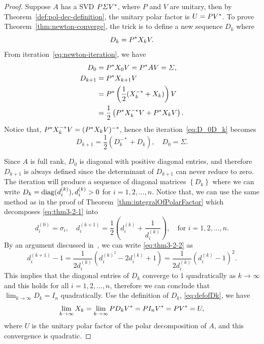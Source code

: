 \documentclass[12pt]{article}
\begin{document}
\begin{proof}
    Suppose $A$ has a SVD $P\varSigma V^*$, where $P$ and $V$ are unitary, then by Theorem~\ref{def:pol-dec-definition}, the unitary polar factor is $U = PV^*$. To prove Theorem~\ref{thm:newton-converge}, the trick is to define a new sequence $D_k$ where 
    \begin{equation}
        \label{eq:defofDk} 
        D_k = P^* X_k V.
    \end{equation} 
    From iteration~\eqref{eq:newton-iteration}, we have 
    \begin{equation}
        \label{eq:D_0D_k}
        \begin{aligned}
            D_0 &= P^* X_0 V = P^* A V = \varSigma,\\
            D_{k + 1} & = P^* X_{k+1} V \\
            & = P^* \left(\frac{1}{2} (X_k^{-*} + X_k)\right) V\\
            & = \frac{1}{2} \left(P^* X_k^{-*} V + P^* X_k V\right).
        \end{aligned}
    \end{equation}
    Notice that, $P^* X_k^{-*}V = (P^* X_k V)^{-*}$, hence the iteration~\eqref{eq:D_0D_k} becomes 
    \begin{equation}
        \label{eq:thm3-2-1} 
        D_{k + 1} = \frac{1}{2} \left(D_k^{-*} + D_k\right),\quad D_0 = \Sigma.
    \end{equation}

    Since $A$ is full rank, $D_0$ is diagonal with positive diagonal entries, and therefore $D_{k + 1}$ is always defined since the determinant of $D_{k+1}$ can never reduce to zero. The iteration will produce a sequence of diagonal matrices $\left\{D_k\right\}$ where we can write $D_k = \mathrm{diag}(d_i^{(k)}), d_i^{(k)} > 0$ for $i = 1,2,\dots,n$. Notice that, we can use the same method as in the proof of Theorem~\ref{thm:integralOfPolarFactor} which decomposes \eqref{eq:thm3-2-1} into 
    \begin{equation}
        \label{eq:thm3-2-2}
    	d_i^{(0)}=\sigma_i, \quad d_i^{(k+1)}=\frac{1}{2}\left(d_i^{(k)}+\frac{1}{d_i^{(k)}}\right),\quad \text{for $i = 1,2,\dots, n.$}
    \end{equation}
	By an argument discussed in~, we can write \eqref{eq:thm3-2-2} as 
    \begin{equation}\label{eq:quadConv}
        d_i^{(k+1)}-1=\frac{1}{2 d_i^{(k)}}\left(d_i^{(k)^2}-2 d_i^{(k)}+1\right)=\frac{1}{2 d_i^{(k)}}\left(d_i^{(k)}-1\right)^2.
    \end{equation}
    This implies that the diagonal entries of $D_k$ converge to $1$ quadratically as $k\to\infty$ and this holds for all $i = 1,2,\dots, n$, therefore we can conclude that $\lim_{k\to \infty}D_k = I_n$ quadratically. Use the definition of $D_k$, \eqref{eq:defofDk}, we have 
    \begin{equation}
        \notag
        \lim_{k\to\infty} X_k = \lim_{k\to\infty} PD_kV^* = PI_n V^* = PV^* = U,
    \end{equation}
    where $U$ is the unitary polar factor of the polar decomposition of $A$, and this convergence is quadratic. 


\end{proof}
\end{document}
